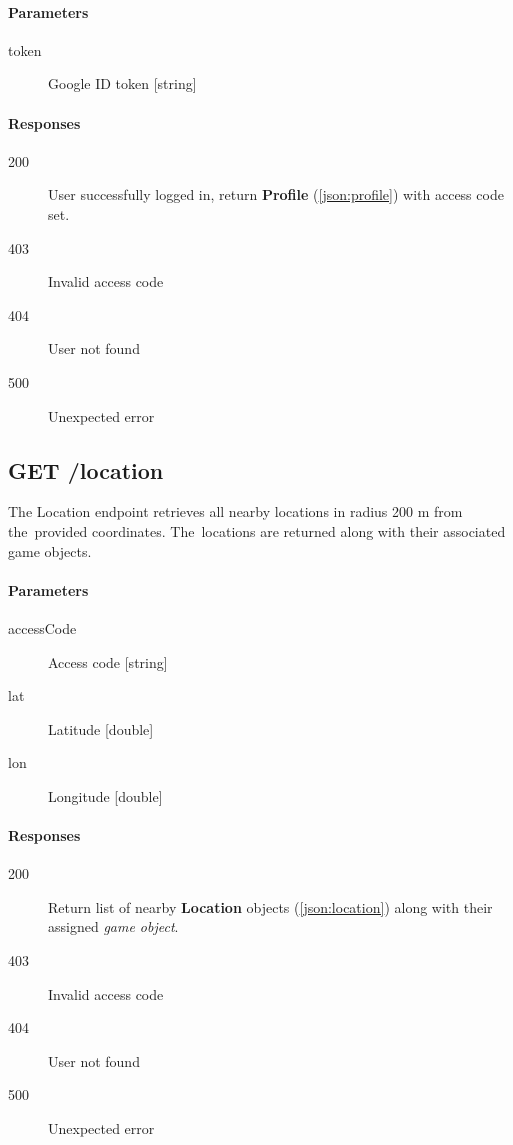 		\paragraph*{Parameters}
		\begin{description}
			\item[token] Google ID token [string]
		\end{description}
		\paragraph*{Responses}
		\begin{description}
			\item[200] User successfully logged in, return \textbf{Profile} (\ref{json:profile}) with access code set.
			\item[403] Invalid access code
			\item[404] User not found
			\item[500] Unexpected error
		\end{description}
	
	\subsection{GET /location}
		The Location endpoint retrieves all nearby locations in radius 200 m from the~provided coordinates. The~locations are returned along with their associated game objects.
		\paragraph*{Parameters}
		\begin{description}
			\item[accessCode] Access code [string]
			\item[lat] Latitude [double]
			\item[lon] Longitude [double]
		\end{description}
		\paragraph*{Responses}
		\begin{description}
			\item[200] Return list of nearby \textbf{Location} objects (\ref{json:location}) along with their assigned \textit{game object}.
			\item[403] Invalid access code
			\item[404] User not found
			\item[500] Unexpected error
		\end{description}